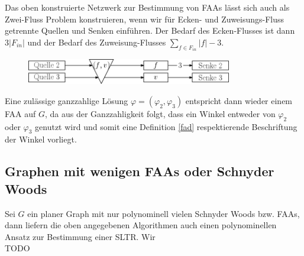 \begin{remark}

Das oben konstruierte Netzwerk zur Bestimmung von FAAs lässt sich auch als Zwei-Fluss Problem konstruieren, wenn wir für Ecken- und Zuweisungs-Fluss getrennte Quellen und Senken einführen. Der Bedarf des Ecken-Flusses ist dann $3|F_{in}|$ und der Bedarf des Zuweisung-Flusses $\sum_{f \in F_{in}}{|f|-3}$.

\begin{figure}[h]
	\centering
  \includegraphics[width=0.8\textwidth]{faa_2_flow.png}
\end{figure}

Eine zulässige ganzzahlige Lösung $\varphi = (\varphi_2,\varphi_3)$ entspricht dann wieder einem FAA auf $G$, da aus der Ganzzahligkeit folgt, dass ein Winkel entweder von $\varphi_2$ oder $\varphi_3$ genutzt wird und somit eine Definition \ref{fad} respektierende Beschriftung der Winkel vorliegt.

\end{remark}

\subsection{Graphen mit wenigen FAAs oder Schnyder Woods}

Sei $G$ ein planer Graph mit nur polynominell vielen Schnyder Woods bzw. FAAs, dann liefern die oben angegebenen Algorithmen auch einen polynominellen Ansatz zur Bestimmung einer SLTR. Wir \\
TODO

